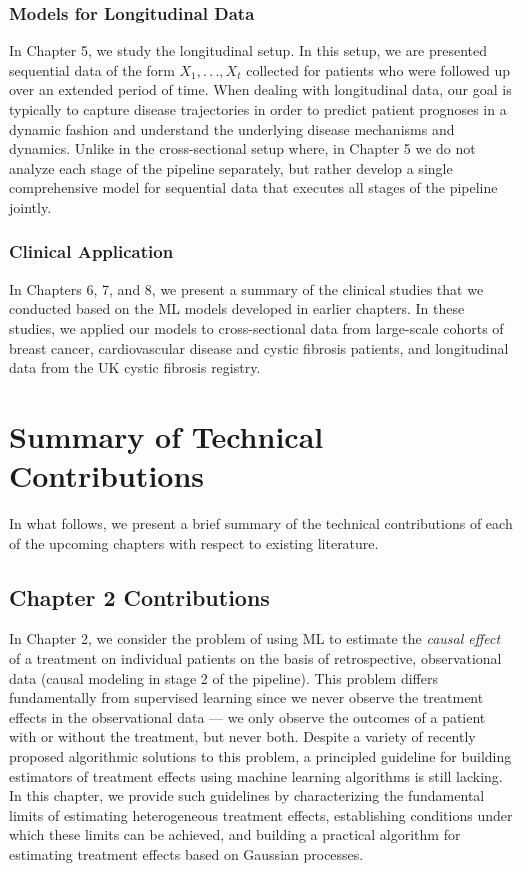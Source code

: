 \documentclass [PhD] {uclathes}
\begin{document}
\subsubsection{Models for Longitudinal Data}
In Chapter 5, we study the longitudinal setup. In this setup, we are presented sequential data of the form $X_1,.\,.\,.,X_t$ collected for patients who were followed up over an extended period of time. When dealing with longitudinal data, our goal is typically to capture disease trajectories in order to predict patient prognoses in a dynamic fashion and understand the underlying disease mechanisms and dynamics. Unlike in the cross-sectional setup where, in Chapter 5 we do not analyze each stage of the pipeline separately, but rather develop a single comprehensive model for sequential data that executes all stages of the pipeline jointly.     

\subsubsection{Clinical Application}
In Chapters 6, 7, and 8, we present a summary of the clinical studies that we conducted based on the ML models developed in earlier chapters. In these studies, we applied our models to cross-sectional data from large-scale cohorts of breast cancer, cardiovascular disease and cystic fibrosis patients, and longitudinal data from the UK cystic fibrosis registry.

\section{Summary of Technical Contributions}
In what follows, we present a brief summary of the technical contributions of each of the upcoming chapters with respect to existing literature.

\label{Sec12}
\subsection*{Chapter 2 Contributions}
In Chapter 2, we consider the problem of using ML to estimate the \textit{causal effect} of a treatment on individual patients on the basis of retrospective, observational data (causal modeling in stage 2 of the pipeline). This problem differs fundamentally from supervised learning since we never observe the treatment effects in the observational data --- we only observe the outcomes of a patient with or without the treatment, but never both. Despite a variety of recently proposed algorithmic solutions to this problem, a principled guideline for building estimators of treatment effects using machine learning algorithms is still lacking. In this chapter, we provide such guidelines by characterizing the fundamental limits of estimating heterogeneous treatment effects, establishing conditions under which these limits can be achieved, and building a practical algorithm for estimating treatment effects based on Gaussian processes. 
\end{document}
